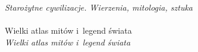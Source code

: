 \documentclass[a4paper,11pt]{article}
\begin{document}
\Powin \emph{Starożytne cywilizacje. Wierzenia, mitologia, sztuka} \\
 \\
\Jest  Wielki atlas mitów i~legend świata \\
\Powin \emph{Wielki atlas mitów i~legend świata} \\


\vspace{\spaceTwo}






 {}



\end{document}
